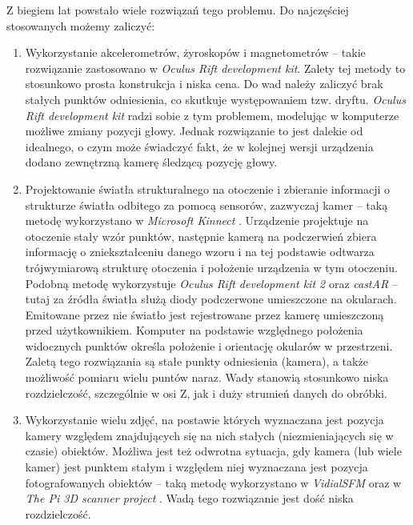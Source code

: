 Z biegiem lat powstało wiele rozwiązań tego problemu. Do najczęściej stosowanych możemy zaliczyć:
\begin{enumerate}
 \item 
 Wykorzystanie akcelerometrów, żyroskopów i magnetometrów -- 
takie rozwiązanie zastosowano w \textit{Oculus Rift development kit}. Zalety tej metody to stosunkowo
prosta konstrukcja i niska cena.
Do wad należy zaliczyć brak stałych punktów odniesienia, co skutkuje występowaniem tzw. dryftu.
\textit{Oculus Rift development kit} radzi sobie z tym problemem, modelując w komputerze możliwe zmiany pozycji głowy.
Jednak rozwiązanie to jest dalekie od idealnego, o czym może świadczyć fakt, że w kolejnej wersji 
urządzenia dodano zewnętrzną kamerę śledzącą pozycję głowy.

\item \label{itm:second_method}
 Projektowanie światła strukturalnego na otoczenie i zbieranie informacji o strukturze 
 światła odbitego za pomocą sensorów, zazwyczaj kamer -- 
 taką metodę wykorzystano w \textit{Microsoft Kinnect} \cite{bib:MicrosoftKinect}.
 Urządzenie projektuje na otoczenie stały wzór punktów, następnie kamerą na podczerwień
 zbiera informację o zniekształceniu danego wzoru i na tej podstawie odtwarza  
 trójwymiarową strukturę otoczenia i położenie urządzenia w tym otoczeniu.
 Podobną metodę wykorzystuje \textit{Oculus Rift development kit 2} \cite{bib:OculusRiftDK2} oraz 
 \textit{castAR} \cite{bib:castAR} -- tutaj za źródła światła służą diody podczerwone umieszczone na okularach.
 Emitowane przez nie światło jest rejestrowane przez kamerę umieszczoną przed użytkownikiem.
 Komputer na podstawie względnego położenia widocznych punktów określa położenie i orientację
 okularów w przestrzeni.
 Zaletą tego rozwiązania są stałe punkty odniesienia (kamera), a także możliwość pomiaru wielu puntów naraz.
 Wady stanowią stosunkowo niska rozdzielczość, szczególnie w osi Z, jak i duży strumień danych do obróbki.

\item
 Wykorzystanie wielu zdjęć, na postawie których 
 wyznaczana jest pozycja kamery względem znajdujących się na nich  stałych (niezmieniających się w czasie) obiektów. 
 Możliwa jest też odwrotna sytuacja, gdy  
  kamera (lub wiele kamer) jest punktem stałym i względem niej wyznaczana jest pozycja fotografowanych obiektów --   
 taką metodę wykorzystano w \textit{VidialSFM} \cite{bib:VisualSFM} oraz w \textit{The Pi 3D scanner project} \cite{bib:pi3dscan}. 
 Wadą tego rozwiązanie jest dość niska rozdzielczość.
 
\end{enumerate}
 

